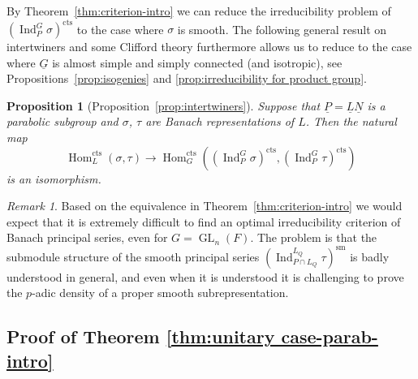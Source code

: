\documentclass[a4paper]{amsart}
\numberwithin{equation}{section}
\newtheorem{prop}[thm]{Proposition}
\theoremstyle{remark}
\newtheorem{remark}[thm]{Remark}
\theoremstyle{definition}
\DeclareMathOperator{\Ind}{Ind}
\DeclareMathOperator{\Hom}{Hom}
\DeclareMathOperator{\GL}{GL}
\newcommand{\sm}{\mathrm{sm}}
\newcommand{\alggrp}[1]{\underline{#1}}
\newcommand{\cts}{\mathrm{cts}}
\begin{document}
By Theorem~\ref{thm:criterion-intro} we can reduce the irreducibility problem of $(\Ind_P^G \sigma)^\cts$ to the case where $\sigma$ is smooth.
The following general result on intertwiners and some Clifford theory furthermore allows us to reduce to the case where $\alggrp G$ is almost simple and simply connected (and isotropic),
see Propositions~\ref{prop:isogenies} and \ref{prop:irreducibility for product group}.

\begin{prop}[Proposition~\ref{prop:intertwiners}]\label{prop:intertwiners_intro}
  Suppose that $\alggrp P = \alggrp L\alggrp N$ is a parabolic subgroup and $\sigma$, $\tau$ are Banach representations of $L$.
  Then the natural map $$\Hom_{L}^\cts(\sigma,\tau) \to \Hom_G^\cts((\Ind_{P}^G\sigma)^{\cts},(\Ind_{P}^G\tau)^{\cts})$$ is an isomorphism.
\end{prop}

\begin{remark}
  Based on the equivalence in Theorem~\ref{thm:criterion-intro} we would expect that it is extremely difficult to find an optimal irreducibility criterion of Banach principal series, even for $G = \GL_n(F)$.
The problem is that the submodule structure of the smooth principal series $(\Ind_{P\cap L_Q}^{L_Q} \tau)^\sm$ is badly understood in general, and even when it is understood it is challenging to prove the $p$-adic density of a proper smooth subrepresentation.
\end{remark}

\subsection{Proof of Theorem \ref{thm:unitary case-parab-intro}}
\label{sec:proof-intro2}
\end{document}
